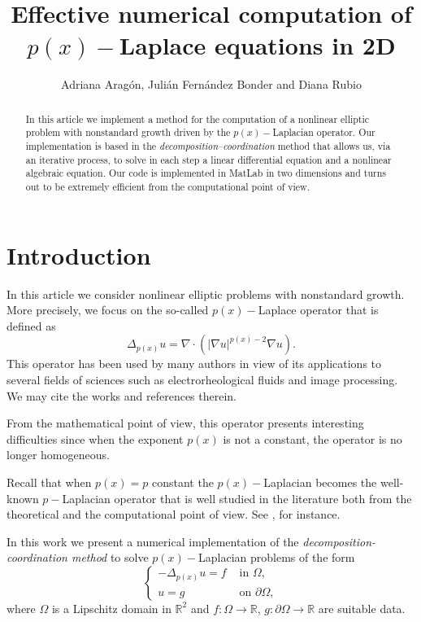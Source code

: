 \documentclass[11pt]{amsart}
\title[Numerical computation for $p(x)-$Laplace equations]{Effective numerical computation of $p(x)-$Laplace equations in 2D}
\author[A. Arag\'on, J. Fern\'andez Bonder and D. Rubio]
{Adriana Arag\'on, Juli\'an Fern\'andez Bonder and Diana Rubio}
\newcommand{\R}{\mathbb R}
\theoremstyle{remark}
\theoremstyle{definition}
\numberwithin{equation}{section}
\begin{document}
\begin{abstract}
In this article we implement a method for the computation of a nonlinear elliptic problem with nonstandard growth driven by the $p(x)-$Laplacian operator. Our implementation is based in the  {\em decomposition--coordination} method that allows us, via an iterative process, to solve in each step a linear differential equation and a nonlinear algebraic equation. Our code is implemented in {\sc MatLab} in two dimensions and turns out to be extremely efficient from the computational point of view.
\end{abstract}

\maketitle

\section{Introduction}
In this article we consider nonlinear elliptic problems with nonstandard growth. More precisely, we focus on the so-called $p(x)-$Laplace operator that is defined as
$$
\Delta_{p(x)} u = \nabla \cdot \left( |\nabla u|^{p(x)-2}\nabla u\right).
$$
This operator has been used by many authors in view of its applications to several fields of sciences such as electrorheological fluids and image processing. We may cite the works \cite{CLR, R} and references therein.

From the mathematical point of view, this operator presents interesting difficulties since when the exponent $p(x)$ is not a constant, the operator is no longer homogeneous.

Recall that when $p(x)=p$ constant the $p(x)-$Laplacian becomes the well-known $p-$Laplacian operator that is well studied in the literature both from the theoretical and the computational point of view. See \cite{BL}, for instance.

In this work we present a numerical implementation of the {\em decomposition-coordination method} to solve $p(x)-$Laplacian problems of the form
\begin{equation}\label{eq.1}
\begin{cases}
-\Delta_{p(x)} u = f & \text{ in }\Omega,\\
u=g & \text{ on }\partial\Omega,
\end{cases}
\end{equation}
where $\Omega$ is a Lipschitz domain in $\R^2$ and $f\colon\Omega\to \R$, $g\colon \partial\Omega\to \R$ are suitable data. 
\end{document}

